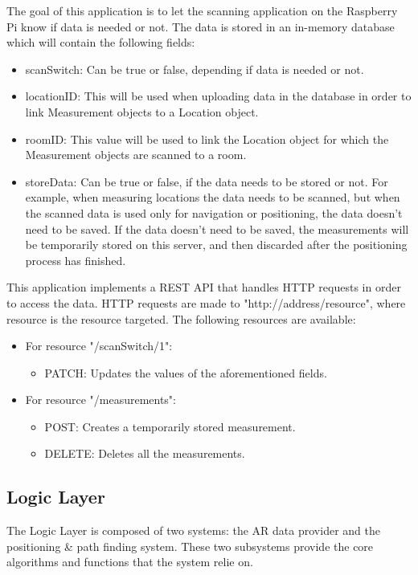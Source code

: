 The goal of this application is to let the scanning application on the Raspberry Pi know if data is needed or not. The data is stored in an in-memory database which will contain the following fields:
\begin{itemize}
    \item scanSwitch: Can be true or false, depending if data is needed or not.
    \item locationID: This will be used when uploading data in the database in order to link Measurement objects to a Location object.
    \item roomID: This value will be used to link the Location object for which the Measurement objects are scanned to a room.
    \item storeData: Can be true or false, if the data needs to be stored or not. For example, when measuring locations the data needs to be scanned, but when the scanned data is used only for navigation or positioning, the data doesn't need to be saved. If the data doesn't need to be saved, the measurements will be temporarily stored on this server, and then discarded after the positioning process has finished.
\end{itemize}

This application implements a REST API that handles HTTP requests in order to access the data. HTTP requests are made to "http://address/resource", where resource is the resource targeted. The following resources are available:
\begin{itemize}
    \item For resource "/scanSwitch/1":
    \begin{itemize}
        \item PATCH: Updates the values of the aforementioned fields.
    \end{itemize}
    
    \item For resource "/measurements":
    \begin{itemize}
        \item POST: Creates a temporarily stored measurement.
        \item DELETE: Deletes all the measurements.
    \end{itemize}
\end{itemize}

\subsection{Logic Layer}
The Logic Layer is composed of two systems: the AR data provider and the positioning \& path finding system. These two subsystems provide the core algorithms and functions that the system relie on. 

